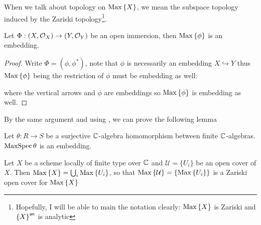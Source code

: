 When we talk about topology on $\operatorname{Max}\left\{X\right\}$, we mean the subspace topology induced by the Zariski topology\footnote{Hopefully, I will be able to main the notation clearly: $\operatorname{Max}\left\{X\right\}$ is Zariski and ${\left\{{X}\right\}}^{\mathsf{an}}$ is analytic}.

\begin{corollary}
  Let $\Phi: \left(X, \mathcal{O}_{X}\right) \to \left(Y, \mathcal{O}_{Y}\right)$ be an open immersion, then $\operatorname{Max}\left\{\phi\right\}$ is an embedding.
\end{corollary}

\begin{proof}
  Write $\Phi= (\phi, \phi^{*})$, note that $\phi$ is necessarily an embedding $X \hookrightarrow Y$ thus $\operatorname{Max}\left\{\phi\right\}$ being the restriction of $\phi$ must be embedding as well:
  \begin{center}
  \end{center}
  where the vertical arrows and $\phi$ are embeddings so $\operatorname{Max}\left\{\phi\right\}$ is embedding as well.
\end{proof}

By the same argument and using , we can prove the following lemma
\begin{lemma}
  Let $\theta: R \to S$ be a surjective $\mathbb{C}$-algebra homomorphism between finite $\mathbb{C}$-algebras.
  $\operatorname{MaxSpec} \theta$ is an embedding.
\end{lemma}

\begin{remark}
  Let $X$ be a scheme locally of finite type over $\mathbb{C}$ and $\mathcal{U} = \{U_{i}\}$ be an open cover of $X$. Then $\operatorname{Max}\left\{X\right\} = \bigcup_{i}\operatorname{Max}\left\{U_{i}\right\}$, so that $\operatorname{Max}\left\{\mathcal{U}\right\} = \{\operatorname{Max}\left\{U_{i}\right\}\}$ is a Zariski open cover for $\operatorname{Max}\left\{X\right\}$
\end{remark}

